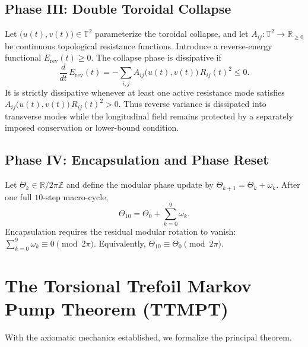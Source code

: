\documentclass[11pt]{article}
\theoremstyle{plain}
\theoremstyle{definition}
\begin{document}
\subsection{Phase III: Double Toroidal Collapse}
Let $\bigl(u(t),v(t)\bigr) \in \mathbb{T}^{2}$ parameterize the toroidal
collapse, and let $A_{ij}\colon \mathbb{T}^{2} \to \mathbb{R}_{\ge 0}$ be
continuous topological resistance functions. Introduce a reverse-energy
functional $E_{\mathrm{rev}}(t) \ge 0$. The collapse phase is dissipative if
\[
  \frac{d}{dt}\,E_{\mathrm{rev}}(t)
    = -\sum_{i,j} A_{ij}\bigl(u(t),v(t)\bigr)\, R_{ij}(t)^{2} \le 0.
\]
It is strictly dissipative whenever at least one active resistance mode satisfies
$A_{ij}\bigl(u(t),v(t)\bigr)\, R_{ij}(t)^{2} > 0$. Thus reverse variance is
dissipated into transverse modes while the longitudinal field remains protected
by a separately imposed conservation or lower-bound condition.

\subsection{Phase IV: Encapsulation and Phase Reset}
Let $\Theta_k \in \mathbb{R}/2\pi\mathbb{Z}$ and define the modular phase update
by $\Theta_{k+1} = \Theta_k + \omega_k$. After one full $10$-step macro-cycle,
\[
  \Theta_{10} = \Theta_0 + \sum_{k=0}^{9} \omega_k.
\]
Encapsulation requires the residual modular rotation to vanish:
$\sum_{k=0}^{9} \omega_k \equiv 0 \pmod{2\pi}$. Equivalently,
$\Theta_{10} \equiv \Theta_0 \pmod{2\pi}$.

\section{The Torsional Trefoil Markov Pump Theorem (TTMPT)}

With the axiomatic mechanics established, we formalize the principal theorem.
\end{document}
